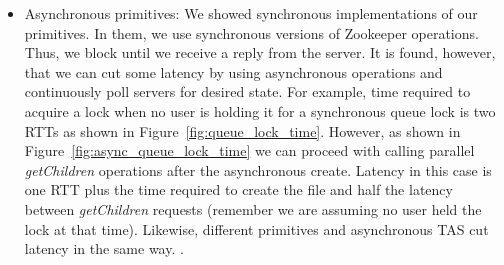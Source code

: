 \begin{itemize}
\item{Asynchronous primitives: We showed synchronous implementations of our primitives. In them, we use synchronous versions of Zookeeper operations. Thus, we block until we receive a reply from the server. It is found, however, that we can cut some latency by using asynchronous operations and continuously poll servers for desired state. For example, time required to acquire a lock when no user is holding it for a synchronous queue lock is two RTTs as shown in Figure~\ref{fig:queue_lock_time}. However, as shown in Figure~\ref{fig:async_queue_lock_time} we can proceed with calling parallel \emph{getChildren} operations after the asynchronous create. Latency in this case is one RTT plus the time required to create the file and half the latency between \emph{getChildren} requests (remember we are assuming no user held the lock at that time). Likewise, different primitives and asynchronous TAS cut latency in the same way. . }
\end{itemize}

